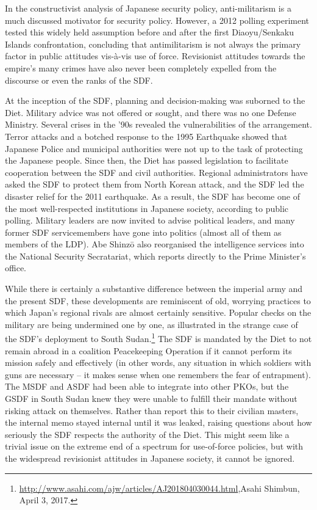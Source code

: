 \documentclass[letterpaper,12pt,twoside]{article} %
\begin{document}
\begin{multicols}{2}
In the constructivist analysis of Japanese security policy, anti-militarism is a much discussed motivator for security policy. However, a 2012 polling experiment tested this widely held assumption before and after the first Diaoyu/Senkaku Islands confrontation, concluding that antimilitarism is not always the primary factor in public attitudes vis-à-vis use of force.\autocite{izumikawa2013attitudes} Revisionist attitudes towards the empire's many crimes have also never been completely expelled from the discourse or even the ranks of the SDF.\autocite[Chapter 4]{smith2019rearmed}

At the inception of the SDF, planning and decision-making was suborned to the Diet. Military advice was not offered or sought, and there was no one Defense Ministry. Several crises in the '90s revealed the vulnerabilities of the arrangement. Terror attacks and a botched response to the 1995 Earthquake showed that Japanese Police and municipal authorities were not up to the task of protecting the Japanese people. Since then, the Diet has passed legislation to facilitate cooperation between the SDF and civil authorities. Regional administrators have asked the SDF to protect them from North Korean attack, and the SDF led the disaster relief for the 2011 earthquake. As a result, the SDF has become one of the most well-respected institutions in Japanese society, according to public polling.\autocite[Chapter 4]{smith2019rearmed} Military leaders are now invited to advise political leaders, and many former SDF servicemembers have gone into politics (almost all of them as members of the LDP). Abe Shinzō also reorganised the intelligence services into the National Security Secratariat, which reports directly to the Prime Minister's office.

While there is certainly a substantive difference between the imperial army and the present SDF, these developments are reminiscent of old, worrying practices to which Japan's regional rivals are almost certainly sensitive. Popular checks on the military are being undermined one by one, as illustrated in the strange case of the SDF's deployment to South Sudan.\footnote{\url{http://www.asahi.com/ajw/articles/AJ201804030044.html},Asahi Shimbun, April 3, 2017.} The SDF is mandated by the Diet to not remain abroad in a coalition Peacekeeping Operation if it cannot perform its mission safely and effectively (in other words, any situation in which soldiers with guns are necessary -- it makes sense when one remembers the fear of entrapment). The MSDF and ASDF had been able to integrate into other PKOs, but the GSDF in South Sudan knew they were unable to fulfill their mandate without risking attack on themselves. Rather than report this to their civilian masters, the internal memo stayed internal until it was leaked, raising questions about how seriously the SDF respects the authority of the Diet. This might seem like a trivial issue on the extreme end of a spectrum for use-of-force policies, but with the widespread revisionist attitudes in Japanese society, it cannot be ignored.


\end{multicols}
\end{document}
